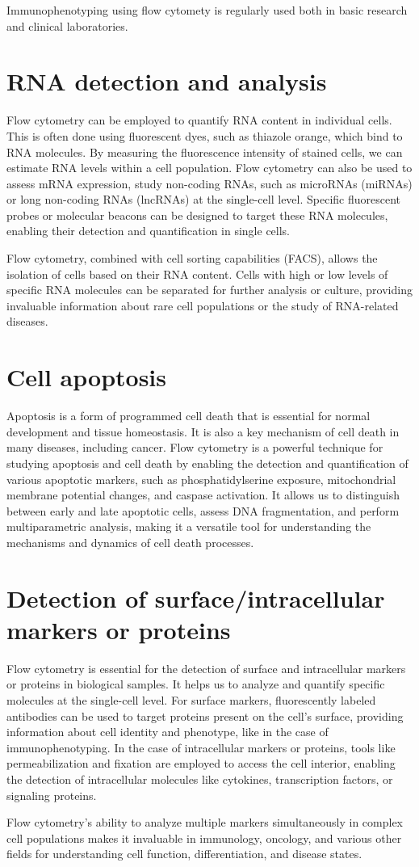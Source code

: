 \documentclass{article}
\begin{document}
Immunophenotyping using flow cytomety is regularly used both in basic research and clinical laboratories.


\section*{RNA detection and analysis}
Flow cytometry can be employed to quantify RNA content in individual cells.
 This is often done using fluorescent dyes, such as thiazole orange, 
 which bind to RNA molecules. By measuring the fluorescence intensity of stained cells,
we can estimate RNA levels within a cell population. Flow cytometry can also be used to assess mRNA expression, study non-coding RNAs, 
such as microRNAs (miRNAs) or long non-coding RNAs (lncRNAs) at the single-cell level. Specific fluorescent probes or molecular beacons
can be designed to target these RNA molecules, enabling their detection and quantification in single cells.

Flow cytometry, combined with cell sorting capabilities (FACS), allows the isolation of cells based on their RNA content. 
Cells with high or low levels of specific RNA molecules can be separated for further analysis or culture,
providing invaluable information about rare cell populations or the study of RNA-related diseases.


\section*{Cell apoptosis}
Apoptosis is a form of programmed cell death that is essential for normal development and tissue homeostasis.
It is also a key mechanism of cell death in many diseases, including cancer.
Flow cytometry is a powerful technique for studying apoptosis and cell death by enabling the detection
and quantification of various apoptotic markers, such as phosphatidylserine exposure, mitochondrial membrane potential changes,
and caspase activation. It allows us to distinguish between early and late apoptotic cells, assess DNA fragmentation,
and perform multiparametric analysis, making it a versatile tool for understanding the mechanisms and dynamics of cell death processes.

\section*{Detection of surface/intracellular markers or proteins}
Flow cytometry is essential for the detection of surface and intracellular markers or 
proteins in biological samples. It helps us to analyze and quantify specific molecules
at the single-cell level. For surface markers, fluorescently labeled antibodies can be used to target
proteins present on the cell's surface, providing information about cell identity and phenotype, like in the case of immunophenotyping. In the
case of intracellular markers or proteins, tools like permeabilization and fixation are
employed to access the cell interior, enabling the detection of intracellular molecules like cytokines,
transcription factors, or signaling proteins. 


Flow cytometry's ability to analyze multiple markers
simultaneously in complex cell populations makes it invaluable in immunology, oncology, and various other
fields for understanding cell function, differentiation, and disease states.
\end{document}
